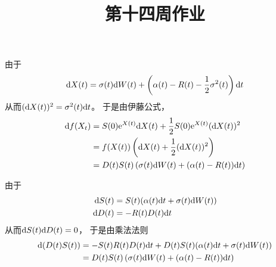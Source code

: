 \documentclass[cn]{homework}
\title{第十四周作业}
\begin{document}
    \maketitle

    \problem[习题5.1]
    \begin{subproblem}
        \item
        由于
        \[\mathrm d X(t)=\sigma(t)\mathrm d W(t)
        +\left(\alpha(t)-R(t)-\frac{1}{2}\sigma^2(t)\right)\mathrm d t\]
        从而$(\mathrm d X(t))^2=\sigma^2(t)\mathrm d t$。
        于是由伊藤公式，
        \[\begin{aligned}
            \mathrm d f(X_t)&=S(0)\mathrm e^{X(t)}\mathrm d X(t)+\frac{1}{2}S(0)\mathrm e^{X(t)}(\mathrm d X(t))^2\\
            &=f(X(t))\left(\mathrm d X(t)+\frac{1}{2}(\mathrm d X(t))^2\right)\\
            &=D(t)S(t)\left(\sigma(t)\mathrm d W(t)+(\alpha(t)-R(t))\mathrm d t\right)
        \end{aligned}\]

        \item
        由于
        \[\begin{aligned}
            \mathrm d S(t)&=S(t)(\alpha(t)\mathrm d t+\sigma(t)\mathrm d W(t))\\
            \mathrm d D(t)&=-R(t)D(t)\mathrm d t
        \end{aligned}\]
        从而$\mathrm d S(t)\mathrm d D(t)=0$，
        于是由乘法法则
        \[\begin{aligned}
            \mathrm d(D(t)S(t))&=-S(t)R(t)D(t)\mathrm d t+D(t)S(t)(\alpha(t)\mathrm d t+\sigma(t)\mathrm d W(t))\\
            &=D(t)S(t)\left(\sigma(t)\mathrm d W(t)+(\alpha(t)-R(t))\mathrm d t\right)
        \end{aligned}\]
    \end{subproblem}
\end{document}
